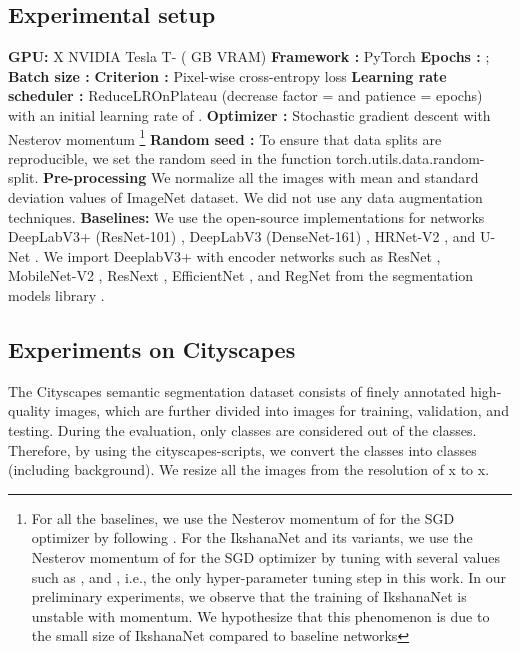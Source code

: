 \documentclass{article}
\begin{document}
\subsection{Experimental setup}
\label{experimental-setup}

\noindent \textbf{GPU:}  X NVIDIA Tesla T- ( GB VRAM)\newline
\textbf{Framework :} PyTorch  \cite{NEURIPS2019_9015}\newline
\textbf{Epochs :}  ;
\textbf{Batch size :} \newline
\textbf{Criterion :} Pixel-wise cross-entropy loss \newline
\textbf{Learning rate scheduler :} ReduceLROnPlateau (decrease factor =  and patience =  epochs) with an initial learning rate of . \newline
\textbf{Optimizer :} Stochastic gradient descent \cite{robbins1951stochastic} with Nesterov momentum \cite{nesterov1983method} \footnote{ For all the baselines, we use the Nesterov momentum  of  for the SGD \cite{robbins1951stochastic} optimizer by following \cite{chen2018encoder,huang2017densely,he2016deep,mobileNetV2,TanL19,RegNet}. For the IkshanaNet and its variants, we use the Nesterov momentum of  for the SGD \cite{robbins1951stochastic} optimizer by tuning with several values such as , and , i.e., the only hyper-parameter tuning step in this work. In our preliminary experiments, we observe that the training of IkshanaNet is unstable with  momentum. We hypothesize that this phenomenon is due to the small size of IkshanaNet compared to baseline networks} \newline
\textbf{Random seed :} To ensure that data splits are reproducible, we set the random seed  in the function torch.utils.data.random-split. \newline
\textbf{Pre-processing} We normalize all the images with mean and standard deviation values of ImageNet \cite{deng2009imagenet} dataset. We did not use any data augmentation techniques.\newline
\textbf{Baselines:} We use the open-source implementations for networks DeepLabV3+ (ResNet-101) \cite{Resnet-101}, DeepLabV3 (DenseNet-161) \cite{Densenet-161}, HRNet-V2 \cite{HRNet-V2},  and U-Net \cite{U-Net}. We import DeeplabV3+ with encoder networks such as ResNet \cite{he2016deep}, MobileNet-V2 \cite{mobileNetV2}, ResNext \cite{Resnext}, EfficientNet \cite{TanL19}, and RegNet \cite{RegNet} from the segmentation models library \cite{Yakubovskiy:2019}.

\subsection{Experiments on Cityscapes}
\label{4.2}
The Cityscapes \cite{cordts2016cityscapes} semantic segmentation dataset consists of  finely annotated high-quality images, which are further divided into  images for training, validation, and testing.  During the evaluation, only  classes are considered out of the  classes. Therefore, by using the cityscapes-scripts, we convert the  classes into  classes (including background). We resize all the images from the resolution of x to x. 
\end{document}
